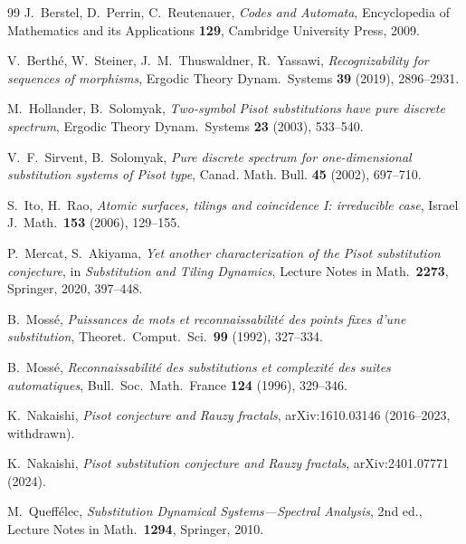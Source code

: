 \documentclass[11pt]{article}
\theoremstyle{plain}
\theoremstyle{definition}
\theoremstyle{remark}
\begin{document}
\begin{thebibliography}{99}
J.~Berstel, D.~Perrin, C.~Reutenauer,
\emph{Codes and Automata},
Encyclopedia of Mathematics and its Applications \textbf{129},
Cambridge University Press, 2009.

V.~Berth\'e, W.~Steiner, J.~M.~Thuswaldner, R.~Yassawi,
\emph{Recognizability for sequences of morphisms},
Ergodic Theory Dynam.\ Systems \textbf{39} (2019), 2896--2931.

M.~Hollander, B.~Solomyak,
\emph{Two-symbol Pisot substitutions have pure discrete spectrum},
Ergodic Theory Dynam.\ Systems \textbf{23} (2003), 533--540.

V.~F.~Sirvent, B.~Solomyak,
\emph{Pure discrete spectrum for one-dimensional substitution systems of Pisot type},
Canad. Math. Bull. \textbf{45} (2002), 697--710.

S.~Ito, H.~Rao,
\emph{Atomic surfaces, tilings and coincidence I: irreducible case},
Israel J.\ Math.\ \textbf{153} (2006), 129--155.

P.~Mercat, S.~Akiyama,
\emph{Yet another characterization of the Pisot substitution conjecture},
in \emph{Substitution and Tiling Dynamics}, Lecture Notes in Math.\ \textbf{2273}, Springer, 2020, 397--448.

B.~Moss\'e,
\emph{Puissances de mots et reconnaissabilit\'e des points fixes d'une substitution},
Theoret.\ Comput.\ Sci.\ \textbf{99} (1992), 327--334.

B.~Moss\'e,
\emph{Reconnaissabilit\'e des substitutions et complexit\'e des suites automatiques},
Bull.\ Soc.\ Math.\ France \textbf{124} (1996), 329--346.

K.~Nakaishi,
\emph{Pisot conjecture and Rauzy fractals},
arXiv:1610.03146 (2016--2023, withdrawn).

K.~Nakaishi,
\emph{Pisot substitution conjecture and Rauzy fractals},
arXiv:2401.07771 (2024).

M.~Queff\'elec,
\emph{Substitution Dynamical Systems---Spectral Analysis},
2nd ed., Lecture Notes in Math.\ \textbf{1294}, Springer, 2010.

\end{thebibliography}
\end{document}
